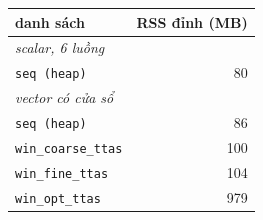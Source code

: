 \begin{tabular}{lr}
\toprule
danh sách & RSS đỉnh (MB) \\
\midrule
\multicolumn{2}{l}{\emph{scalar, 6 luồng}} \\
\texttt{seq (heap)} & 80 \\
\multicolumn{2}{l}{\emph{vector có cửa sổ}} \\
\texttt{seq (heap)} & 86 \\
\texttt{win\_coarse\_ttas} & 100 \\
\texttt{win\_fine\_ttas} & 104 \\
\texttt{win\_opt\_ttas} & 979 \\
\bottomrule
\end{tabular}
